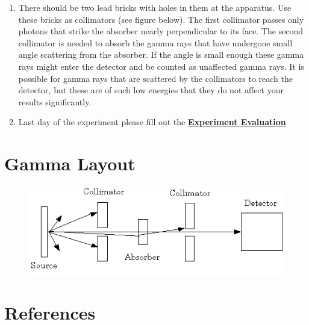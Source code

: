 \documentclass{../lab}
\begin{document}
\begin{enumerate}
\begin{enumerate}
        \item There should be two lead bricks with holes in them at the apparatus. Use these bricks as collimators (see figure below). The first collimator passes only photons that strike the absorber nearly perpendicular to its face. The second collimator is needed to absorb the gamma rays that have undergone small angle scattering from the absorber. If the angle is small enough these gamma rays might enter the detector and be counted as unaffected gamma rays. It is possible for gamma rays that are scattered by the collimators to reach the detector, but these are of such low energies that they do not affect your results significantly.

        \item Last day of the experiment please fill out the \href{\ExperimentEvaluation}{\textbf{Experiment Evaluation}}

    \end{enumerate}

\end{enumerate}

\section{Gamma Layout}

\begin{figure}[h]
    \centering
    \href{http://experimentationlab.berkeley.edu/sites/default/files/images/GMAimage008.gif}{\includegraphics[width=0.5\linewidth]{images/GMAimage008.png}}
    \label{fig:GMAimage008}
\end{figure}

\section{References}
\label{sec:References}
\end{document}

